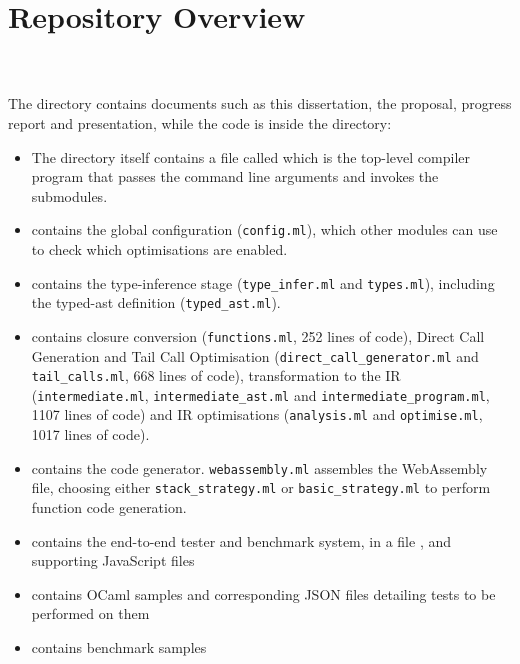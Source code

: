 \section{Repository Overview}
\begin{minipage}{\linewidth}
\end{minipage}
\\\\
The  directory contains documents such as this dissertation, the proposal, progress report and presentation, while the code is inside the  directory:
\begin{itemize}
\item The  directory itself contains a file called  which is the top-level compiler program that passes the command line arguments and invokes the submodules.
\item {} contains the global configuration (\verb|config.ml|), which other modules can use to check which optimisations are enabled.
\item {} contains the type-inference stage (\verb|type_infer.ml| and \verb|types.ml|), including the typed-ast definition (\verb|typed_ast.ml|).
\item {} contains closure conversion (\verb|functions.ml|, 252 lines of code), Direct Call Generation and Tail Call Optimisation (\verb|direct_call_generator.ml| and \verb|tail_calls.ml|, 668 lines of code), transformation to the IR (\verb|intermediate.ml|, \verb|intermediate_ast.ml| and \verb|intermediate_program.ml|, 1107 lines of code) and IR optimisations (\verb|analysis.ml| and \verb|optimise.ml|, 1017 lines of code).
\item {} contains the code generator. \verb|webassembly.ml| assembles the WebAssembly file, choosing either \verb|stack_strategy.ml| or \verb|basic_strategy.ml| to perform function code generation.
\item {} contains the end-to-end tester and benchmark system, in a file , and supporting JavaScript files
\item {} contains OCaml samples and corresponding JSON files detailing tests to be performed on them
\item {} contains benchmark samples
\end{itemize}

